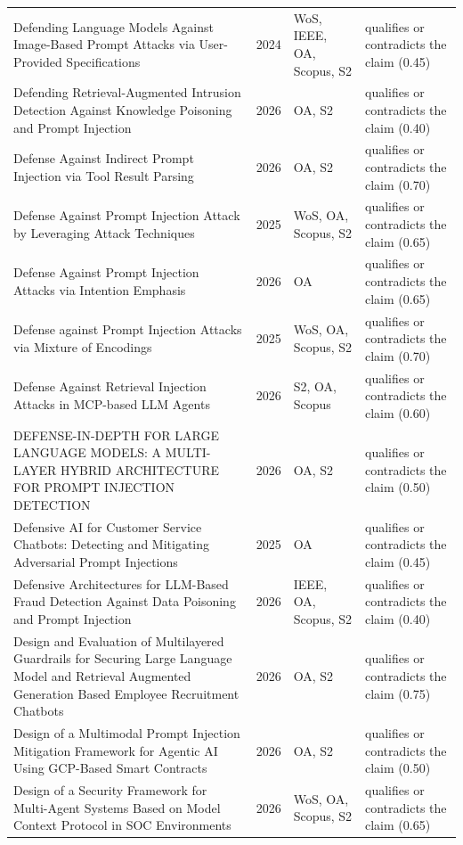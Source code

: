 \begin{longtable}{@{}%
  >{\raggedright\arraybackslash}p{}c%
  >{\raggedright\arraybackslash}p{}%
  >{\raggedright\arraybackslash}p{}@{}}
Defending Language Models Against Image-Based Prompt Attacks via User-Provided Specifications & 2024 & WoS, IEEE, OA, Scopus, S2 & qualifies or contradicts the claim (0.45) \\
Defending Retrieval-Augmented Intrusion Detection Against Knowledge Poisoning and Prompt Injection & 2026 & OA, S2 & qualifies or contradicts the claim (0.40) \\
Defense Against Indirect Prompt Injection via Tool Result Parsing & 2026 & OA, S2 & qualifies or contradicts the claim (0.70) \\
Defense Against Prompt Injection Attack by Leveraging Attack Techniques & 2025 & WoS, OA, Scopus, S2 & qualifies or contradicts the claim (0.65) \\
Defense Against Prompt Injection Attacks via Intention Emphasis & 2026 & OA & qualifies or contradicts the claim (0.65) \\
Defense against Prompt Injection Attacks via Mixture of Encodings & 2025 & WoS, OA, Scopus, S2 & qualifies or contradicts the claim (0.70) \\
Defense Against Retrieval Injection Attacks in MCP-based LLM Agents & 2026 & S2, OA, Scopus & qualifies or contradicts the claim (0.60) \\
DEFENSE-IN-DEPTH FOR LARGE LANGUAGE MODELS: A MULTI-LAYER HYBRID ARCHITECTURE FOR PROMPT INJECTION DETECTION & 2026 & OA, S2 & qualifies or contradicts the claim (0.50) \\
Defensive AI for Customer Service Chatbots: Detecting and Mitigating Adversarial Prompt Injections & 2025 & OA & qualifies or contradicts the claim (0.45) \\
Defensive Architectures for LLM-Based Fraud Detection Against Data Poisoning and Prompt Injection & 2026 & IEEE, OA, Scopus, S2 & qualifies or contradicts the claim (0.40) \\
Design and Evaluation of Multilayered Guardrails for Securing Large Language Model and Retrieval Augmented Generation Based Employee Recruitment Chatbots & 2026 & OA, S2 & qualifies or contradicts the claim (0.75) \\
Design of a Multimodal Prompt Injection Mitigation Framework for Agentic AI Using GCP-Based Smart Contracts & 2026 & OA, S2 & qualifies or contradicts the claim (0.50) \\
Design of a Security Framework for Multi-Agent Systems Based on Model Context Protocol in SOC Environments & 2026 & WoS, OA, Scopus, S2 & qualifies or contradicts the claim (0.65) \\

\end{longtable}
